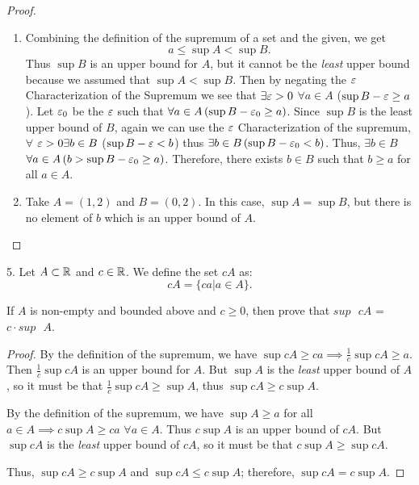 \begin{proof}
	\begin{enumerate}
		\item Combining the definition of the supremum of a set and the given, we get
			\[
				a \le \sup A < \sup B 
			.\] 
			Thus $\sup B$ is an upper bound for $A$, but it cannot be the \textit{least} upper bound because we assumed that $\sup A < \sup B$. Then by negating the $\e$ Characterization of the Supremum we see that $\exists \e > 0$ $\forall a \in A$ ($\sup B - \e \ge  a$). Let $\e_0$ be the $\e$ such that $\forall a \in A\left( \sup B - \e_0 \ge a\right) $. Since $\sup B$ is the least upper bound of $B$, again we can use the $\e$ Characterization of the supremum, $\forall $ $\e > 0 \exists b \in B$ ($\sup B - \e < b$) thus $\exists b \in B\left( \sup B - \e_0 < b \right) $. Thus, $\exists b \in B$ $\forall a \in A\left( b > \sup B - \e_0 \ge a \right) $. Therefore, there exists $b \in B$ such that $b \ge a$ for all $ a \in A$.
		\item Take $A = \left( 1, 2 \right) $ and $B = \left( 0, 2 \right) $. In this case, $\sup A = \sup B$, but there is no element of $b$ which is an upper bound of $A$.
	\end{enumerate}
\end{proof}

5. Let $A \subset \mathbb{R}$ and $c \in \mathbb{R}$. We define the set $cA$ as:
\[
	cA = \{ca | a \in A\}
.\] 

If $A$ is non-empty and bounded above and $c\ge 0$, then prove that $sup \text{ } cA$ = $c \cdot sup \text{ } A $.

\begin{proof}
	By the definition of the supremum, we have $\sup cA \ge ca \implies \frac{1}{c} \sup cA \ge a$. Then $\frac{1}{c} \sup cA$ is an upper bound for $A$. But $\sup A$ is the \textit{least} upper bound of $A$, so it must be that $\frac{1}{c} \sup cA\ge \sup A$, thus $\sup cA \ge c\sup A$.

	By the definition of the supremum, we have $\sup A \ge a$ for all $a \in A \implies c \sup A \ge ca$ $\forall a \in A$. Thus $c \sup A$ is an upper bound of  $cA$. But $\sup cA$ is the \textit{least} upper bound of $cA$, so it must be that $c \sup A \ge \sup cA$.

	Thus, $\sup cA \ge c \sup A$ and $\sup cA \le c \sup A$; therefore, $\sup cA = c \sup A$. 
\end{proof}






